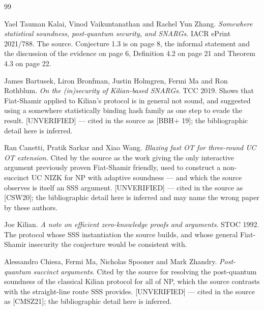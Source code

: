 \documentclass{aicr-conjecture}
\begin{document}
\begin{aicrbibliography}{99}

Yael Tauman Kalai, Vinod Vaikuntanathan and Rachel Yun Zhang.
\emph{Somewhere statistical soundness, post-quantum security, and
SNARGs}.
IACR ePrint 2021/788.
The source. Conjecture 1.3 is on page 8, the informal statement and the
discussion of the evidence on page 6, Definition 4.2 on page 21 and
Theorem 4.3 on page 22.

James Bartusek, Liron Bronfman, Justin Holmgren, Fermi Ma and Ron
Rothblum.
\emph{On the (in)security of Kilian-based SNARGs}.
TCC 2019.
Shows that Fiat-Shamir applied to Kilian's protocol is in general not
sound, and suggested using a somewhere statistically binding hash family
as one step to evade the result. [UNVERIFIED] --- cited in the source as
[BBH+ 19]; the bibliographic detail here is inferred.

Ran Canetti, Pratik Sarkar and Xiao Wang.
\emph{Blazing fast OT for three-round UC OT extension}.
Cited by the source as the work giving the only interactive argument
previously proven Fiat-Shamir friendly, used to construct a non-succinct
UC NIZK for NP with adaptive soundness --- and which the source observes is
itself an SSS argument. [UNVERIFIED] --- cited in the source as [CSW20];
the bibliographic detail here is inferred and may name the wrong paper by
these authors.

Joe Kilian.
\emph{A note on efficient zero-knowledge proofs and arguments}.
STOC 1992.
The protocol whose SSS instantiation the source builds, and whose general
Fiat-Shamir insecurity the conjecture would be consistent with.

Alessandro Chiesa, Fermi Ma, Nicholas Spooner and Mark Zhandry.
\emph{Post-quantum succinct arguments}.
Cited by the source for resolving the post-quantum soundness of the
classical Kilian protocol for all of NP\@, which the source contrasts with
the straight-line route SSS provides. [UNVERIFIED] --- cited in the source
as [CMSZ21]; the bibliographic detail here is inferred.

\end{aicrbibliography}
\end{document}
